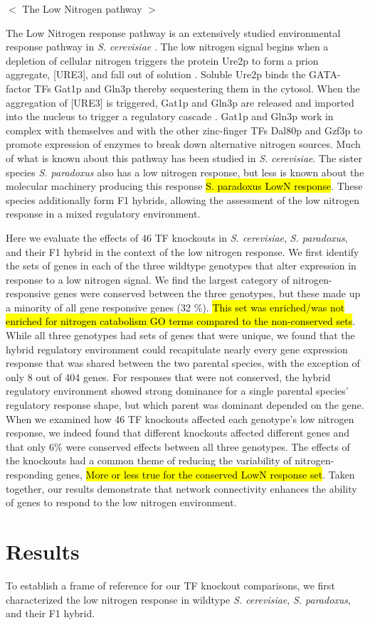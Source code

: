 $<$ The Low Nitrogen pathway $>$

The Low Nitrogen response pathway is an extensively studied environmental response pathway in \textit{S. cerevisiae} \cite{Magasanik2005}. The low nitrogen signal begins when a depletion of cellular nitrogen triggers the protein Ure2p to form a prion aggregate, [URE3], and fall out of solution \cite{Wickner1994}. Soluble Ure2p binds the GATA-factor TFs Gat1p and Gln3p thereby sequestering them in the cytosol. When the aggregation of [URE3] is triggered, Gat1p and Gln3p are released and imported into the nucleus to trigger a regulatory cascade \cite{Zhang2018}. Gat1p and Gln3p work in complex with themselves and with the other zinc-finger TFs Dal80p and Gzf3p to promote expression of enzymes to break down alternative nitrogen sources. Much of what is known about this pathway has been studied in \textit{S. cerevisiae}. The sister species \textit{S. paradoxus} also has a low nitrogen response, but less is known about the molecular machinery producing this response \hl{S. paradoxus LowN response}. These species additionally form F1 hybrids, allowing the assessment of the low nitrogen response in a mixed regulatory environment. 

Here we evaluate the effects of 46 TF knockouts in \textit{S. cerevisiae}, \textit{S. paradoxus}, and their F1 hybrid in the context of the low nitrogen response. We first identify the sets of genes in each of the three wildtype genotypes that alter expression in response to a low nitrogen signal. We find the largest category of nitrogen-responsive genes were conserved between the three genotypes, but these made up a minority of all gene responsive genes (32 \%). \hl{This set was enriched/was not enriched for nitrogen catabolism GO terms compared to the non-conserved sets}. While all three genotypes had sets of genes that were unique, we found that the hybrid regulatory environment could recapitulate nearly every gene expression response that was shared between the two parental species, with the exception of only 8 out of 404 genes. For responses that were not conserved, the hybrid regulatory environment showed strong dominance for a single parental species' regulatory response shape, but which parent was dominant depended on the gene. When we examined how 46 TF knockouts affected each genotype's low nitrogen response, we indeed found that different knockouts affected different genes and that only 6\% were conserved effects between all three genotypes. The effects of the knockouts had a common theme of reducing the variability of nitrogen-responding genes, \hl{More or less true for the conserved LowN response set}. Taken together, our results demonstrate that network connectivity enhances the ability of genes to respond to the low nitrogen environment.

\section{Results}

To establish a frame of reference for our TF knockout comparisons, we first characterized the low nitrogen response in wildtype \textit{S. cerevisiae}, \textit{S. paradoxus}, and their F1 hybrid.

\subsection{}